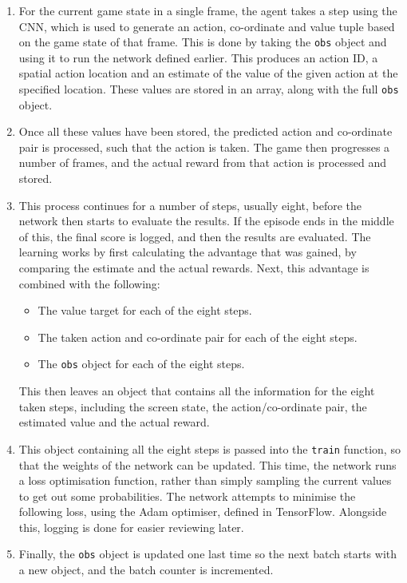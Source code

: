 \begin{enumerate}
    \item For the current game state in a single frame, the agent takes a step
        using the CNN, which is used to generate an action, co-ordinate and value
        tuple based on the game state of that frame. This is done by taking the
        \texttt{obs} object and using it to run the network defined earlier.
        This produces an action ID, a spatial action location and an estimate of
        the value of the given action at the specified location. These values
        are stored in an array, along with the full \texttt{obs} object.
    \item Once all these values have been stored, the predicted action and
        co-ordinate pair is processed, such that the action is taken. The game
        then progresses a number of frames, and the actual reward from that
        action is processed and stored.
    \item This process continues for a number of steps, usually eight, before the
        network then starts to evaluate the results. If the episode ends in the
        middle of this, the final score is logged, and then the results are
        evaluated. The learning works by first calculating the advantage that
        was gained, by comparing the estimate and the actual rewards. Next, this
        advantage is combined with the following:
        \begin{itemize}
            \item The value target for each of the eight steps.
            \item The taken action and co-ordinate pair for each of the eight steps.
            \item The \texttt{obs} object for each of the eight steps.
        \end{itemize}
        This then leaves an object that contains all the information for the
        eight taken steps, including the screen state, the action/co-ordinate
        pair, the estimated value and the actual reward.
    \item This object containing all the eight steps is passed into the
        \texttt{train} function, so that the weights of the network can be
        updated.  This time, the network runs a loss optimisation function,
        rather than simply sampling the current values to get out some
        probabilities. The network attempts to minimise the following loss,
        using the Adam optimiser, defined in TensorFlow.  Alongside this,
        logging is done for easier reviewing later.
    \item Finally, the \texttt{obs} object is updated one last time so the next
        batch starts with a new object, and the batch counter is incremented.
\end{enumerate}


